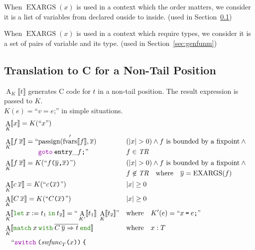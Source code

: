 \documentclass[a4paper,fleqn]{article}
\newcommand{\kwlet}{\mbox{\color{mygreen}\ttfamily let}}
\newcommand{\kwin}{\mbox{\color{mygreen}\ttfamily in}}
\newcommand{\kwmatch}{\mbox{\color{mygreen}\ttfamily match}}
\newcommand{\kwwith}{\mbox{\color{mygreen}\ttfamily with}}
\newcommand{\kwend}{\mbox{\color{mygreen}\ttfamily end}}
\newcommand{\letin}[3]{\kwlet\:#1:=#2\:\kwin\:#3}
\newcommand{\omatch}[2]{\kwmatch\:#1\:\kwwith\:{#2}\:\kwend}
\DeclareMathOperator{\EXARGS}{EXARGS}
\newcommand{\BRA}[1]{\llbracket #1 \rrbracket}
\newcommand{\tr}{\mathit{TR}}
\newcommand{\ldq}{\text{``}}
\newcommand{\rdq}{\text{''}}
\newcommand{\dq}[1]{\text{``}#1\text{''}}
\newcommand{\ttparen}[1]{\texttt{(}#1\texttt{)}}
\newcommand{\ttlbrace}{\texttt{\char '173}}
\newcommand{\tteq}{\texttt{=}}
\newcommand{\ttsemi}{\texttt{;}}
\newcommand{\ttcomma}{\texttt{,}}
\newcommand{\kwswitch}{\mbox{\color{myviolet}\ttfamily switch}}
\newcommand{\kwgoto}{\mbox{\color{myviolet}\ttfamily goto}}
\newcommand{\secref}[1]{Section~\ref{#1}}
\DeclareMathOperator{\passign}{passign}
\DeclareMathOperator{\fvarsop}{fvars}
\newcommand{\fvarsd}[1]{\fvarsop'\BRA{#1}}
\DeclareMathOperator{\Aop}{A}
\newcommand{\A}[2]{\Aop_{#1}\BRA{#2}}
\newcommand{\rep}[1]{\overline{#1}}
\begin{document}
When $\EXARGS(x)$ is used in a context which the order matters,
we consider it is a list of variables from declared ouside to inside.
(used in \secref{sec:AK})

When $\EXARGS(x)$ is used in a context which require types,
we consider it is a set of pairs of variable and its type.
(used in \secref{sec:genfunm})

\subsection{Translation to C for a Non-Tail Position}\label{sec:AK}
$\A{K}{t}$ generates C code for $t$ in a non-tail position.
The result expression is passed to $K$. \\
$K(e) = \dq{v = e\ttsemi}$ in simple situations.
\begin{align*}
  &\A{K}{x} = K(\dq{x}) \\
  &\A{K}{f\:\rep{x}} =
      \begin{aligned}[t] \ldq & {\passign(\fvarsd{f}, \rep{x})} \\ & \kwgoto\:\mathtt{entry\_}f\ttsemi \rdq \end{aligned}
    && \begin{aligned}[t] & (|x| > 0) \wedge \text{$f$ is bounded by a fixpoint} \wedge {} \\ & f \in \tr \end{aligned} \\
  &\A{K}{f\:\rep{x}} = K(\dq{f\ttparen{\rep{y}\ttcomma \rep{x}}})
    && \begin{aligned}[t] & (|x| > 0) \wedge \text{$f$ is bounded by a fixpoint} \wedge {} \\ & f \not\in \tr \quad \text{where} \quad \rep{y} = \EXARGS(f) \end{aligned} \\
      &\A{K}{c\:\rep{x}} = K(\dq{c\ttparen{\rep{x}}})                                   && |x| \geq 0 \\
  &\A{K}{C\:\rep{x}} = K(\dq{C\ttparen{\rep{x}}})                                   && |x| \geq 0 \\
  &\A{K}{\letin{x}{t_1}{t_2}} = \ldq \A{K'}{t_1}\; \A{K}{t_2} \rdq
    && \text{where}\quad K'(e) = \dq{x\:\tteq\:e\ttsemi} \\
  &\A{K}{\omatch{x}{\rep{C\:\rep{y}\Rightarrow t}}} && \text{where}\quad x : T \\
     & \quad\begin{alignedat}{2}
       \ldq & \kwswitch\:\ttparen{\mathit{swfunc}_T\ttparen{x}}\:\ttlbrace \\

\end{alignedat}
\end{align*}
\end{document}
